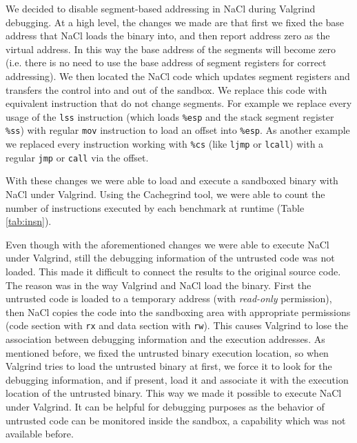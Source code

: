 \documentclass[conference]{IEEEtran}
\begin{document}
We decided to disable segment-based addressing in  NaCl during Valgrind debugging. At a high level, the changes we made are 
that first we fixed the base address that NaCl loads the binary into, and then report address zero as the  virtual address. 
In this way  the base address of the segments will become zero (i.e. there is no need to use the base address of segment registers  
for correct addressing). We then located the NaCl code which updates segment registers and transfers the control into and 
out of the sandbox. We replace this code with equivalent instruction that do not change segments. For example we replace 
every usage of the \texttt{lss} instruction (which loads \texttt{\%esp} and the stack segment register \texttt{\%ss}) with 
regular \texttt{mov} instruction to load an offset into  \texttt{\%esp}. As another example we replaced every instruction 
working with \texttt{\%cs} (like \texttt{ljmp} or \texttt{lcall}) with a regular \texttt{jmp} or \texttt{call} via the offset.

With these changes we were able to load and execute a sandboxed binary with  NaCl under Valgrind. Using the Cachegrind tool, 
we were able to count the number of instructions executed by each benchmark at  runtime (Table \ref{tab:insn}).

Even though with the aforementioned changes we were able to execute NaCl under Valgrind, still the debugging information 
of the untrusted code was not loaded. This made it difficult to connect the results to the original source code. 
The reason was in the way Valgrind and NaCl load the  binary. First the untrusted code is loaded to a temporary address 
(with \textit{read-only} permission), then NaCl copies the code into the sandboxing area with appropriate permissions 
(code section with \texttt{rx} and data section with \texttt{rw}). This causes Valgrind to lose the association between 
debugging information and the execution addresses. As mentioned before, we fixed the untrusted binary execution location, 
so when Valgrind tries to load the untrusted binary at first, we force it to look for the debugging information, and if present, 
load it and associate it with the execution location of the untrusted binary.
This way we made it possible to execute NaCl under  Valgrind. It can be helpful for debugging purposes as the behavior 
of untrusted code can be monitored inside the sandbox, a capability which was not available before.
\end{document}
